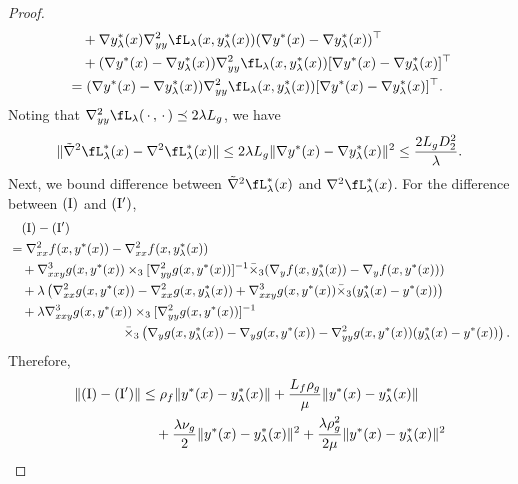 \begin{proof}
\begin{align*}
    &\quad + \nabla y_{\lambda}^*(x) \nabla_{yy}^2 \fL_{\lambda} (x,y_{\lambda}^*(x)) (\nabla y^*(x) - \nabla y_{\lambda}^*(x))^\top \\
    &\quad + (\nabla y^*(x) - \nabla y_{\lambda}^*(x)) \nabla_{yy}^2 \fL_{\lambda} (x,y_{\lambda}^*(x)) [ \nabla y^*(x) - \nabla y_{\lambda}^*(x)]^\top \\
    &= (\nabla y^*(x) - \nabla y_{\lambda}^*(x)) \nabla_{yy}^2 \fL_{\lambda} (x,y_{\lambda}^*(x)) [ \nabla y^*(x) - \nabla y_{\lambda}^*(x)]^\top.
\end{align*}
Noting that $ \nabla_{yy}^2 \fL_{\lambda}(\,\cdot\, , \,\cdot\,) \preceq 2 \lambda L_g$, we have
\begin{align*}
    \Vert \tilde \nabla^2 \fL_{\lambda}^*(x) - \nabla^2 \fL_{\lambda}^*(x) \Vert \le 2 \lambda L_g \Vert \nabla y^*(x) - \nabla y_{\lambda}^*(x) \Vert^2 \le \frac{2L_g D_2^2}{\lambda }. 
\end{align*}
Next, we bound difference between 
$\tilde \nabla^2 \fL_{\lambda}^*(x) $ and $\nabla^2 \fL_{\lambda}^*(x)$. For the difference between ${\rm (I)}$ and ${\rm (I')}$, 
{\begin{align*}
    &\quad \rm (I) - {\rm (I')} \\
    &= \nabla_{xx}^2 f(x,y^*(x)) - \nabla_{xx}^2 f(x,y_{\lambda}^*(x))  \\
    & \quad + \nabla_{xxy}^3 g(x,y^*(x)) \times_3 [\nabla_{yy}^2 g(x,y^*(x))]^{-1} \bar \times_3 ( \nabla_y f(x,y_{\lambda}^*(x)) - \nabla_y f(x,y^*(x))) \\
    &\quad + \lambda \left( \nabla_{xx}^2 g(x,y^*(x)) -  \nabla_{xx}^2 g(x,y_{\lambda}^*(x))  + \nabla_{xxy}^3  g(x,y^*(x)) \bar \times_3
    (y_{\lambda}^*(x) - y^*(x)) \right) \\
    &\quad + \lambda \nabla_{xxy}^3 g(x,y^*(x)) \times_3 [\nabla_{yy}^2 g(x,y^*(x))]^{-1} 
 \\
 &~~~~~~~~~~~~~~~~~~~~~~~~~~~\bar \times_3 \left(\nabla_y g(x,y_{\lambda}^*(x)) 
    - \nabla_y g(x,y^*(x)) - \nabla_{yy}^2 g(x,y^*(x)) (y_{\lambda}^*(x) -y^*(x))  \right).
\end{align*}}
Therefore, 
\begin{align*}
    \Vert {\rm (I) } - {\rm (I')} \Vert &\le \rho_f \Vert y^*(x) - y_{\lambda}^*(x) \Vert  + \frac{L_f \rho_g}{\mu} \Vert y^*(x) - y_{\lambda}^*(x) \Vert \\
    &\quad + \frac{\lambda \nu_g}{2} \Vert y^*(x) - y_{\lambda}^*(x) \Vert^2 + \frac{\lambda \rho_g^2}{2\mu} \Vert y^*(x) - y_{\lambda}^*(x) \Vert^2  \\

\end{align*}
\end{proof}
